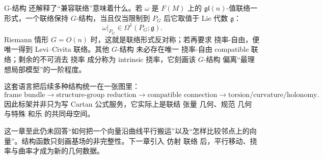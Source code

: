 G-结构 还解释了“兼容联络”意味着什么。若 $\omega$ 是 $F(M)$ 上的 $\mathfrak{gl}(n)$-值联络一形式，一个联络保持 $G$-结构，当且仅当限制到 $P_G$ 后它取值于 Lie 代数 $\mathfrak g$：
\begin{equation*}\omega|_{P_G}\in\Omega^1(P_G;\mathfrak g).\end{equation*}
Riemann 情形 $G=O(n)$ 时，这就是联络形式反对称；若再要求 挠率-自由，便唯一得到 Levi--Civita 联络。其他 $G$-结构 未必存在唯一 挠率-自由 compatible 联络；剩余的不可消去 挠率 成分称为 intrinsic 挠率，它刻画该 $G$-结构 偏离“最理想局部模型”的一阶程度。

这套语言把后续多种结构统一在一张图里：
\[
\text{frame bundle}
\longrightarrow
\text{structure-group reduction}
\longrightarrow
\text{compatible connection}
\longrightarrow
\text{torsion/curvature/holonomy}.
\]
因此标架并非只为写 Cartan 公式服务，它实际上是联结 张量 几何、规范 几何 与特殊 和乐 的共同母空间。

这一章至此仍未回答“如何把一个向量沿曲线平行搬运”以及“怎样比较邻点上的向量”。结构函数只刻画基场的非完整性。下一章引入 仿射 联络 后，平行移动、挠率与曲率才成为新的几何数据。


